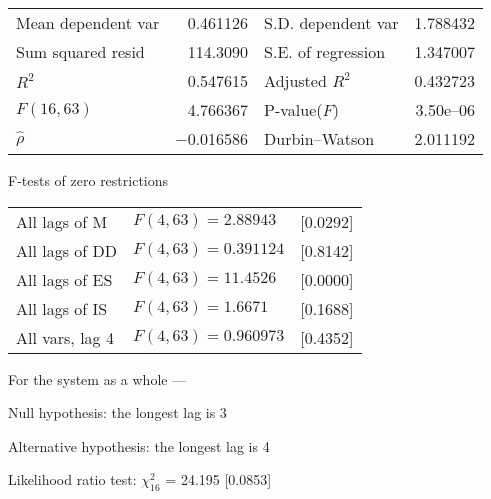 \documentclass[11pt]{article}
\begin{document}
\begin{center}
\vspace{1ex}
\begin{tabular}{lrlr}
Mean dependent var &  0.461126 & S.D. dependent var &  1.788432 \\
Sum squared resid &  114.3090 & S.E. of regression &  1.347007 \\
$R^2$ &  0.547615 & Adjusted $R^2$ &  0.432723 \\
$F(16, 63)$ &  4.766367 & P-value($F$) &  3.50\textrm{e--06} \\
$\hat{\rho}$ & $-$0.016586 & Durbin--Watson &  2.011192 \\
\end{tabular}


\end{center}

\begin{center}
F-tests of zero restrictions\\[1em]
\begin{tabular}{lll}
All lags of M & $F(4, 63) = 2.88943$ & [0.0292]\\
All lags of DD & $F(4, 63) = 0.391124$ & [0.8142]\\
All lags of ES & $F(4, 63) = 11.4526$ & [0.0000]\\
All lags of IS & $F(4, 63) = 1.6671$ & [0.1688]\\
All vars, lag 4 & $F(4, 63) = 0.960973$ & [0.4352]\\
\end{tabular}
\end{center}

\clearpage


\noindent For the system as a whole ---\par
Null hypothesis: the longest lag is 3\par
Alternative hypothesis: the longest lag is 4\par
Likelihood ratio test: $\chi^2_{16}$ = 24.195 [0.0853]\par
\end{document}
